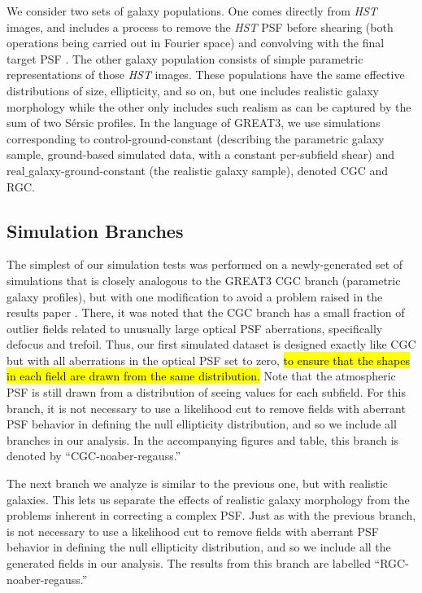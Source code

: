 \documentclass[iop]{emulateapj}
\begin{document}
We consider two sets of galaxy populations.  One comes directly from
{\it HST} images, and includes a process to remove the {\it HST} PSF before
shearing (both operations being carried out in Fourier space) and
convolving with the final target PSF \citep{2012MNRAS.420.1518M}.  The
other galaxy population consists of simple parametric representations
of those {\it HST} images.  These populations have the same effective
distributions of size, ellipticity, and so on, but one includes
realistic galaxy morphology while the other only includes such realism
as can be captured by the sum of two S\'{e}rsic profiles.  In the
language of GREAT3, we use simulations corresponding to
control-ground-constant (describing the parametric galaxy sample,
ground-based simulated data, with a constant per-subfield shear) and
real$\_$galaxy-ground-constant (the realistic galaxy sample), denoted
CGC and RGC.

\subsection{Simulation Branches}
\label{sec:branches}

The simplest of our simulation tests was performed on a
newly-generated set of simulations that is closely analogous to the
GREAT3 CGC branch (parametric galaxy profiles), but with one
modification to avoid a problem raised in the results paper
\citep{2015MNRAS.450.2963M}.  There, it was noted that the CGC branch
has a small fraction of outlier fields related to unusually large
optical PSF aberrations, specifically defocus and trefoil.  Thus, our
first simulated dataset is designed exactly like CGC but with all
aberrations in the optical PSF set to zero, \hl{to ensure that the shapes
in each field are drawn from the same distribution.}  Note that
the atmospheric PSF is still drawn from a distribution of seeing
values for each subfield. For this branch, it is not necessary to use
a likelihood cut to remove fields with aberrant PSF behavior in
defining the null ellipticity distribution, and so we include all
branches in our analysis. In the accompanying figures and table, this
branch is denoted by ``CGC-noaber-regauss.''

The next branch we analyze is similar to the previous one, but with
realistic galaxies. This lets us separate the effects of realistic
galaxy morphology from the problems inherent in correcting a complex
PSF. Just as with the previous branch, is not necessary to use a
likelihood cut to remove fields with aberrant PSF behavior in defining
the null ellipticity distribution, and so we include all the generated
fields in our analysis. The results from this branch are labelled
``RGC-noaber-regauss.''
\end{document}
